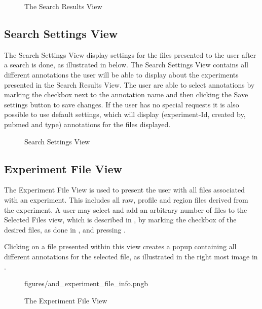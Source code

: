\begin{figure}[h]
\caption{The Search Results View}
\label{fig:and_search_results_man} 
\end{figure}
\FloatBarrier


\subsection{Search Settings View}\label{sec:search_settings}
The Search Settings View display settings for the files presented to the user after a search is done, as illustrated in   below. The Search Settings View contains all different annotations the user will be able to display about the experiments presented in the Search Results View. The user are able to select annotations by marking the checkbox next to the annotation name and then clicking the Save settings button to save changes. If the user has no special requests it is also possible to use default settings, which will display (experiment-Id, created by, pubmed and type) annotations for the files displayed. 



\begin{figure}[ht]
\caption{Search Settings View}
\label{fig:and_search_settings_man}
\end{figure}
\FloatBarrier


\subsection{Experiment File View}
The Experiment File View is used to present the user with all files associated with an experiment. This includes all raw, profile and region files derived from the experiment. A user may select and add an arbitrary number of files to the Selected Files view, which is described in , by marking the checkbox of the desired files, as done in  , and pressing .

Clicking on a file presented within this view creates a popup containing all different annotations for the selected file, as illustrated in the right most image in .

\begin{figure}[h]
		{figures/and_experiment_file_info.png}{b}
\caption{The Experiment File View}
\label{fig:and_experiment_man}
\end{figure}
\FloatBarrier






